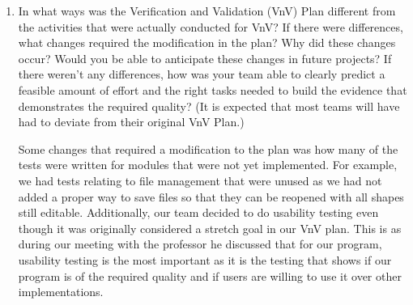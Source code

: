 \documentclass[12pt, titlepage]{article}
\begin{document}
\begin{enumerate}
  The parts of this document that stemmed from client/user input are the
   sections related to usability testing: section 4.1. This is because to
    properly gauge how the program feels to use we needed input from users
     who have never used the program before, letting us test learnability and
     other problems that someone who worked on the program may not find.
      Other tests were related to the development or functions (unit tests)
       which did not need as much outside input to properly test.

  \item In what ways was the Verification and Validation (VnV) Plan different
  from the activities that were actually conducted for VnV?  If there were
  differences, what changes required the modification in the plan?  Why did
  these changes occur?  Would you be able to anticipate these changes in future
  projects?  If there weren't any differences, how was your team able to clearly
  predict a feasible amount of effort and the right tasks needed to build the
  evidence that demonstrates the required quality?  (It is expected that most
  teams will have had to deviate from their original VnV Plan.)

  Some changes that required a modification to the plan was how many of the
   tests were written for modules that were not yet implemented. For example,
    we had tests relating to file management that were unused as we had not
     added a proper way to save files so that they can be reopened with all
      shapes still editable. Additionally, our team decided to do usability
       testing even though it was originally considered a stretch goal in our
        VnV plan. This is as during our meeting with the professor he
         discussed that for our program, usability testing is the most
          important as it is the testing that shows if our program is of the
           required quality and if users are willing to use it over other
            implementations.
\end{enumerate}
\end{document}
